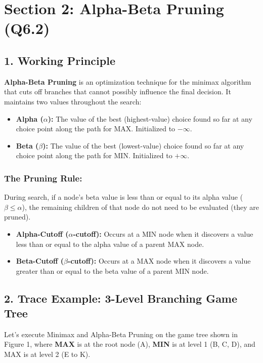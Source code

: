 \section{Section 2: Alpha-Beta Pruning (Q6.2)}

\subsection{1. Working Principle}
\textbf{Alpha-Beta Pruning} is an optimization technique for the minimax algorithm that cuts off branches that cannot possibly influence the final decision. It maintains two values throughout the search:
\begin{itemize}
  \item   \textbf{Alpha ($\alpha$):} The value of the best (highest-value) choice found so far at any choice point along the path for MAX. Initialized to $-\infty$.
  \item   \textbf{Beta ($\beta$):} The value of the best (lowest-value) choice found so far at any choice point along the path for MIN. Initialized to $+\infty$.
\end{itemize}

\subsubsection{The Pruning Rule:}
During search, if a node's beta value is less than or equal to its alpha value ($\beta \le \alpha$), the remaining children of that node do not need to be evaluated (they are pruned).

\begin{itemize}
  \item   \textbf{Alpha-Cutoff ($\alpha$-cutoff):} Occurs at a MIN node when it discovers a value less than or equal to the alpha value of a parent MAX node.
  \item   \textbf{Beta-Cutoff ($\beta$-cutoff):} Occurs at a MAX node when it discovers a value greater than or equal to the beta value of a parent MIN node.
\end{itemize}


\subsection{2. Trace Example: 3-Level Branching Game Tree}

Let's execute Minimax and Alpha-Beta Pruning on the game tree shown in Figure 1, where \textbf{MAX} is at the root node (A), \textbf{MIN} is at level 1 (B, C, D), and MAX is at level 2 (E to K).

